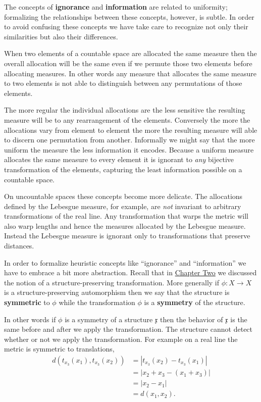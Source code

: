 \documentclass[
  letterpaper,
  DIV=11,
  numbers=noendperiod]{scrartcl}
\begin{document}
The concepts of \textbf{ignorance} and \textbf{information} are related
to uniformity; formalizing the relationships between these concepts,
however, is subtle. In order to avoid confusing these concepts we have
take care to recognize not only their similarities but also their
differences.

When two elements of a countable space are allocated the same measure
then the overall allocation will be the same even if we permute those
two elements before allocating measures. In other words any measure that
allocates the same measure to two elements is not able to distinguish
between any permutations of those elements.

The more regular the individual allocations are the less sensitive the
resulting measure will be to any rearrangement of the elements.
Conversely the more the allocations vary from element to element the
more the resulting measure will able to discern one permutation from
another. Informally we might say that the more uniform the measure the
less information it encodes. Because a uniform measure allocates the
same measure to every element it is ignorant to \emph{any} bijective
transformation of the elements, capturing the least information possible
on a countable space.

On uncountable spaces these concepts become more delicate. The
allocations defined by the Lebesgue measure, for example, are \emph{not}
invariant to arbitrary transformations of the real line. Any
transformation that warps the metric will also warp lengths and hence
the measures allocated by the Lebesgue measure. Instead the Lebesgue
measure is ignorant only to transformations that preserve distances.

In order to formalize heuristic concepts like ``ignorance'' and
``information'' we have to embrace a bit more abstraction. Recall that
in
\href{https://betanalpha.github.io/assets/chapters_html/spaces.html}{Chapter
Two} we discussed the notion of a structure-preserving transformation.
More generally if \(\phi : X \rightarrow X\) is a structure-preserving
automorphism then we say that the structure is \textbf{symmetric} to
\(\phi\) while the transformation \(\phi\) is a \textbf{symmetry} of the
structure.

In other words if \(\phi\) is a symmetry of a structure \(\mathfrak{x}\)
then the behavior of \(\mathfrak{x}\) is the same before and after we
apply the transformation. The structure cannot detect whether or not we
apply the transformation. For example on a real line the metric is
symmetric to translations, \begin{align*}
d( t_{x_{3}}(x_{1}), t_{x_{3}}(x_{2}) )
&=
| t_{x_{3}}(x_{2}) - t_{x_{3}}(x_{1}) |
\\
&=
| x_{2} + x_{3} - (x_{1} + x_{3}) |
\\
&=
| x_{2} - x_{1} |
\\
&=
d(x_{1}, x_{2}).
\end{align*}
\end{document}
